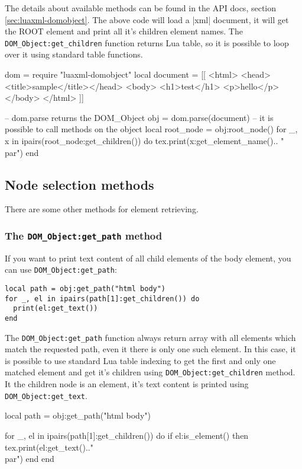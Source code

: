 \documentclass{ltxdoc}
\begin{document}
The details about available methods can be found in the API docs, section
\ref{sec:luaxml-domobject}. The above code will load a |xml| document, it will
get the ROOT element and print all it's children element names.  The
\verb|DOM_Object:get_children| function returns Lua table, so it is possible to
loop over it using standard table functions.

\begin{framed}
\begin{luacode*}
dom = require "luaxml-domobject"
local document = [[
<html>
<head><title>sample</title></head>
<body>
<h1>test</h1>
<p>hello</p>
</body>
</html>
  ]]

-- dom.parse returns the DOM_Object
obj = dom.parse(document)
-- it is possible to call methods on the object
local root_node = obj:root_node()
for _, x in ipairs(root_node:get_children()) do
  tex.print(x:get_element_name().. "\\par")
end
\end{luacode*}
\end{framed}

\subsection{Node selection methods}
There are some other methods for element retrieving. 

\subsubsection{The \texttt{DOM\_Object:get\_path} method}
If you want to print text content of all child elements of the body element, you can use \verb|DOM_Object:get_path|:

\begin{verbatim}
local path = obj:get_path("html body")
for _, el in ipairs(path[1]:get_children()) do
  print(el:get_text())
end
\end{verbatim}

The \verb|DOM_Object:get_path| function always return array with all elements
which match the requested path, even it there is only one such element. In this
case, it is possible to use standard Lua table indexing to get the first and
only one matched element and get it's children using
\verb|DOM_Object:get_children| method. It the children node is an element, it's
text content is printed using \verb|DOM_Object:get_text|.



\begin{framed}
  \begin{luacode*}
local path = obj:get_path("html body")

for _, el in ipairs(path[1]:get_children()) do
  if el:is_element() then
    tex.print(el:get_text().."\\par")
  end
end
  \end{luacode*}
\end{framed}
\end{document}
